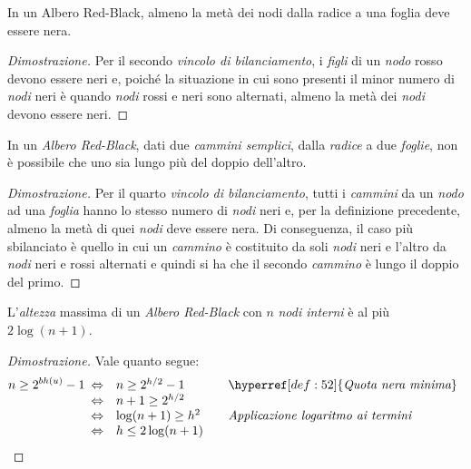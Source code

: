 \begin{definition}
    In un Albero Red-Black, almeno la metà dei nodi dalla radice a una foglia
    deve essere nera.
\end{definition}
\begin{proof}[Dimostrazione]
    Per il secondo \emph{vincolo di bilanciamento}, i \emph{figli} di un
    \emph{nodo} rosso devono essere neri e, poiché la situazione in cui sono
    presenti il minor numero di \emph{nodi} neri è quando \emph{nodi} rossi
    e neri sono alternati, almeno la metà dei \emph{nodi} devono essere neri.
\end{proof}

\begin{definition}
    In un \emph{Albero Red-Black}, dati due \emph{cammini semplici}, dalla
    \emph{radice} a due \emph{foglie}, non è possibile che uno sia lungo più
    del doppio dell'altro.
\end{definition}
\begin{proof}[Dimostrazione]
    Per il quarto \emph{vincolo di bilanciamento}, tutti i \emph{cammini} da
    un \emph{nodo} ad una \emph{foglia} hanno lo stesso numero di \emph{nodi}
    neri e, per la definizione precedente, almeno la metà di quei \emph{nodi}
    deve essere nera. Di conseguenza, il caso più sbilanciato è quello in cui
    un \emph{cammino} è costituito da soli \emph{nodi} neri e l'altro da
    \emph{nodi} neri e rossi alternati e quindi si ha che il secondo \emph{cammino}
    è lungo il doppio del primo.
\end{proof}

\begin{definition}
    L'\emph{altezza} massima di un \emph{Albero Red-Black} con $n$ \emph{nodi
    interni} è al più $2\log(n+1)$.
\end{definition}
\begin{proof}[Dimostrazione]
    Vale quanto segue:
    \[n\geq2^{bh(u)}-1\begin{array}[t]{cll}
        \Leftrightarrow & n\geq2^{h/2}-1 & \quad\hyperref[def:52]{\emph{Quota nera minima}}\\
        \Leftrightarrow & n+1\geq2^{h/2}\\
        \Leftrightarrow & \log(n+1)\geq h^2 & \quad\emph{Applicazione logaritmo ai termini}\\
        \Leftrightarrow & h\leq2\log(n+1)
    \end{array}\]
\end{proof}

